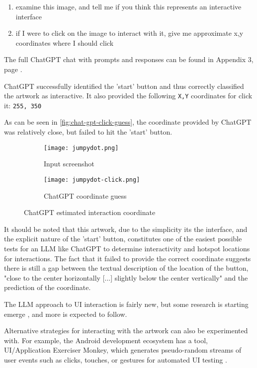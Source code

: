 \begin{enumerate}
	\item examine this image, and tell me if you think this represents an interactive interface
	\item if I were to click on the image to interact with it, give me approximate x,y coordinates where I should click
\end{enumerate}


The full ChatGPT chat with prompts and responses can be found in Appendix 3, page \pageref{chap:chatgpt-mouse}.

ChatGPT successfully identified the 'start' button and thus correctly classified the artwork as interactive. It also provided the following \texttt{X,Y} coordinates for click it: \texttt{255, 350}

As can be seen in \autoref{fig:chat-gpt-click-guess}, the coordinate provided by ChatGPT was relatively close, but failed to hit the 'start' button.

\begin{figure}[H]
  \centering
  \begin{subfigure}[b]{0.45\textwidth}
    \centering
    \texttt{[image: jumpydot.png]}
    \caption{Input screenshot}
    \label{fig:image1}
  \end{subfigure}
  \hfill
  \begin{subfigure}[b]{0.45\textwidth}
    \centering
    \texttt{[image: jumpydot-click.png]}
    \caption{ChatGPT coordinate guess}
    \label{fig:image2}
  \end{subfigure}
  \caption{ChatGPT estimated interaction coordinate}
  \label{fig:chat-gpt-click-guess}
\end{figure}

It should be noted that this artwork, due to the simplicity its the interface, and the explicit nature of the 'start' button, constitutes one of the easiest possible tests for an LLM like ChatGPT to determine interactivity and hotspot locations for interactions. The fact that it failed to provide the correct coordinate suggests there is still a gap between the textual description of the location of the button, "close to the center horizontally [...] slightly below the center vertically" and the prediction of the coordinate.

The LLM approach to UI interaction is fairly new, but some research is starting emerge \cite{liuMakeLLMTesting2024}, and more is expected to follow.

Alternative strategies for interacting with the artwork can also be experimented with. For example, the Android development ecosystem has a tool, UI/Application Exerciser Monkey, which generates pseudo-random streams of user events such as clicks, touches, or gestures for automated UI testing \cite{UIApplicationExerciser}.

